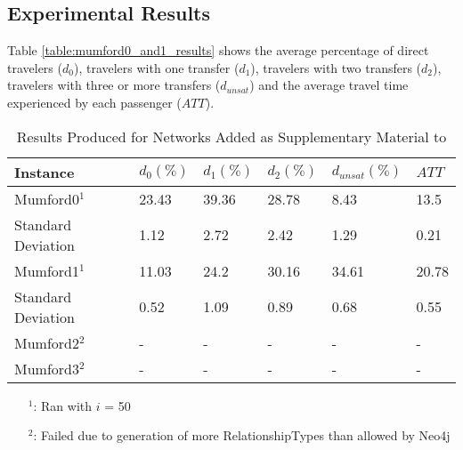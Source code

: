 \subsection{Experimental Results}
\label{subsec:scalabilityExperiments_results}


Table \vref{table:mumford0_and1_results} shows the average percentage of direct travelers ($d_0$), travelers with one transfer ($d_1$), travelers with two transfers ($d_2$), travelers with three or more transfers ($d_{unsat}$) and the average travel time experienced by each passenger ($ATT$).

\begin{table}[H]
    \centering
    \hspace*{-1.0cm}
    \begin{tabular}{|l|l|l|l|l|l|}
        \hline
        Instance & $d_0(\%)$ & $d_1(\%)$ & $d_2(\%)$ & $d_{unsat}(\%)$ & $ATT$\\
        \hline
        Mumford0$^1$ & 23.43 & 39.36 & 28.78 & 8.43 & 13.5\\
        Standard Deviation & 1.12 & 2.72 & 2.42 & 1.29 & 0.21\\
        \hline
        Mumford1$^1$ & 11.03 & 24.2 & 30.16 & 34.61 & 20.78\\
        Standard Deviation & 0.52 & 1.09 & 0.89 & 0.68 & 0.55\\
        \hline
        Mumford2$^2$ & - & - & - & - & - \\
        Mumford3$^2$ & - & - & - & - & - \\
        \hline
    \end{tabular}
    \caption{Results Produced for Networks Added as Supplementary Material to \citet{mumford13}}
    \tiny
    \begin{itemize}[noitemsep]
    \item[$^1$:] Ran with $i$ = 50
    \item[$^2$:] Failed due to generation of more RelationshipTypes than allowed by Neo4j
    \end{itemize}
    \label{table:mumford0_and1_results}
\end{table}

